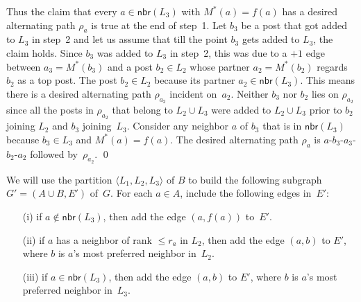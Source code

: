 \documentclass[11pt]{llncs}
\newcommand{\Nbr}{\mathsf{nbr}}
\begin{document}
Thus the claim that every $a \in \Nbr(L_3)$ with $M^*(a) = f(a)$ has a desired alternating path $\rho_a$ is true at
the end of step~1. Let $b_3$ be a post that got added to $L_3$ in step~2 and
let us assume that till the point $b_3$ gets added to $L_3$, the claim holds.
Since $b_3$ was added to $L_3$ in step~2, this was due to a $+1$ edge between $a_3 = M^*(b_3)$ 
and a post $b_2 \in L_2$ whose partner $a_2 = M^*(b_2)$ regards $b_2$ as a top post. 
The post $b_2 \in L_2$ because its partner $a_2 \in \Nbr(L_3)$. 
This means there is a desired alternating path $\rho_{a_2}$ incident on~$a_2$.
Neither $b_3$ nor $b_2$ lies on $\rho_{a_2}$ since all the posts in $\rho_{a_2}$ that belong to 
$L_2 \cup L_3$ were added to $L_2 \cup L_3$ prior to $b_2$ joining $L_2$ and $b_3$ joining~$L_3$. 
Consider any neighbor $a$ of $b_3$ that is in $\Nbr(L_3)$ because $b_3 \in L_3$ and $M^*(a) = f(a)$. 
The desired alternating path $\rho_a$ is $a$-$b_3$-$a_3$-$b_2$-$a_2$ followed by~$\rho_{a_2}$. \qed


\medskip

We will use the partition $\langle L_1,L_2,L_3 \rangle$ of $B$ 
to build the following subgraph $G' = (A\cup B, E')$ of~$G$. For each $a \in A$, 
include the following edges in~$E'$:  
\begin{itemize}
\item[(i)] if $a \notin \Nbr(L_3)$, then add the edge $(a,f(a))$ to~$E'$.
\item[(ii)] if $a$ has a neighbor of rank $\le r_a$ in $L_2$, then add the edge $(a,b)$ to $E'$, 
where $b$ is $a$'s most preferred neighbor in~$L_2$.
\item[(iii)] if $a \in \Nbr(L_3)$, then add the edge $(a,b)$ to $E'$, where $b$ is $a$'s most 
preferred neighbor in~$L_3$.
\end{itemize}
\end{document}
